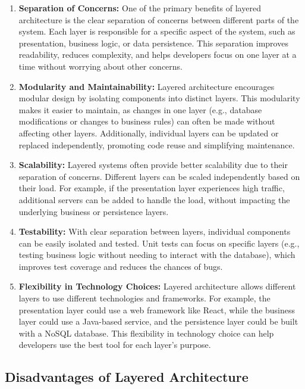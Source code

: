 \begin{enumerate}
	\item \textbf{Separation of Concerns:} 
	One of the primary benefits of layered architecture is the clear separation of concerns between different parts of the system. Each layer is responsible for a specific aspect of the system, such as presentation, business logic, or data persistence. This separation improves readability, reduces complexity, and helps developers focus on one layer at a time without worrying about other concerns.
	
	\item \textbf{Modularity and Maintainability:} 
	Layered architecture encourages modular design by isolating components into distinct layers. This modularity makes it easier to maintain, as changes in one layer (e.g., database modifications or changes to business rules) can often be made without affecting other layers. Additionally, individual layers can be updated or replaced independently, promoting code reuse and simplifying maintenance.
	
	\item \textbf{Scalability:} 
	Layered systems often provide better scalability due to their separation of concerns. Different layers can be scaled independently based on their load. For example, if the presentation layer experiences high traffic, additional servers can be added to handle the load, without impacting the underlying business or persistence layers.
	
	\item \textbf{Testability:} 
	With clear separation between layers, individual components can be easily isolated and tested. Unit tests can focus on specific layers (e.g., testing business logic without needing to interact with the database), which improves test coverage and reduces the chances of bugs.
	
	\item \textbf{Flexibility in Technology Choices:} 
	Layered architecture allows different layers to use different technologies and frameworks. For example, the presentation layer could use a web framework like React, while the business layer could use a Java-based service, and the persistence layer could be built with a NoSQL database. This flexibility in technology choice can help developers use the best tool for each layer's purpose.
\end{enumerate}

\subsection{Disadvantages of Layered Architecture}

